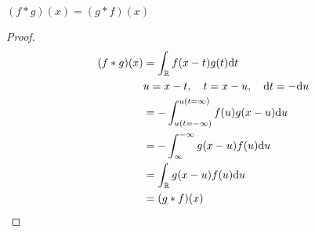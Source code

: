 $(f\ast g)(x) = (g \ast f)(x)$
\begin{proof}
    \begin{align*}
        (f\ast g)(x) &= \int_{\mathbb{R}} f(x-t) g(t) \dd t \\
        & u=x-t, \quad t=x-u, \quad \dd t = - \dd u\\
        &= -\int_{u(t=-\infty)}^{u(t=\infty)} f(u) g(x-u) \dd u\\
        &= - \int_{\infty}^{-\infty} g(x-u) f(u) \dd u \\
        &= \int_{\mathbb{R}} g(x-u) f(u) \dd u \\
        &= (g \ast f)(x)
    \end{align*}
\end{proof}